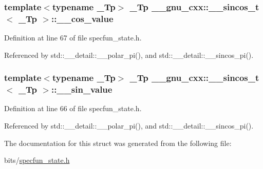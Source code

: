 \subsubsection[{\texorpdfstring{\+\_\+\+\_\+cos\+\_\+value}{__cos_value}}]{\setlength{\rightskip}{0pt plus 5cm}template$<$typename \+\_\+\+Tp$>$ \+\_\+\+Tp {\bf \+\_\+\+\_\+gnu\+\_\+cxx\+::\+\_\+\+\_\+sincos\+\_\+t}$<$ \+\_\+\+Tp $>$\+::\+\_\+\+\_\+cos\+\_\+value}\hypertarget{struct____gnu__cxx_1_1____sincos__t_a576e454b7c18f9f52a8f0e97fc3eec87}{}\label{struct____gnu__cxx_1_1____sincos__t_a576e454b7c18f9f52a8f0e97fc3eec87}


Definition at line 67 of file specfun\+\_\+state.\+h.



Referenced by std\+::\+\_\+\+\_\+detail\+::\+\_\+\+\_\+polar\+\_\+pi(), and std\+::\+\_\+\+\_\+detail\+::\+\_\+\+\_\+sincos\+\_\+pi().

\subsubsection[{\texorpdfstring{\+\_\+\+\_\+sin\+\_\+value}{__sin_value}}]{\setlength{\rightskip}{0pt plus 5cm}template$<$typename \+\_\+\+Tp$>$ \+\_\+\+Tp {\bf \+\_\+\+\_\+gnu\+\_\+cxx\+::\+\_\+\+\_\+sincos\+\_\+t}$<$ \+\_\+\+Tp $>$\+::\+\_\+\+\_\+sin\+\_\+value}\hypertarget{struct____gnu__cxx_1_1____sincos__t_ab33398e9213fa67fdd770c70d5f99953}{}\label{struct____gnu__cxx_1_1____sincos__t_ab33398e9213fa67fdd770c70d5f99953}


Definition at line 66 of file specfun\+\_\+state.\+h.



Referenced by std\+::\+\_\+\+\_\+detail\+::\+\_\+\+\_\+polar\+\_\+pi(), and std\+::\+\_\+\+\_\+detail\+::\+\_\+\+\_\+sincos\+\_\+pi().



The documentation for this struct was generated from the following file\+:\begin{DoxyCompactItemize}
\item 
bits/\hyperlink{specfun__state_8h}{specfun\+\_\+state.\+h}\end{DoxyCompactItemize}
